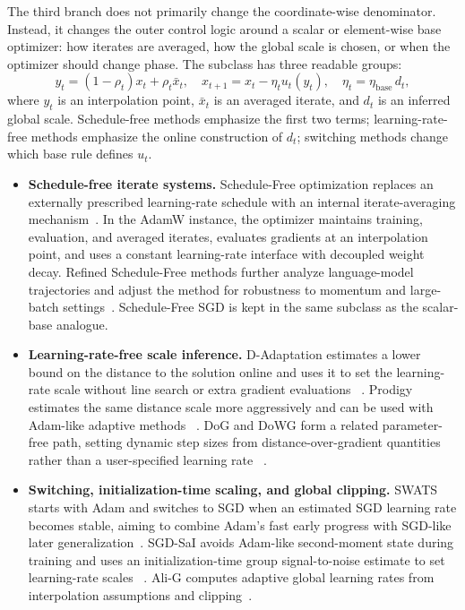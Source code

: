 The third branch does not primarily change the coordinate-wise denominator.
Instead, it changes the outer control logic around a scalar or element-wise
base optimizer: how iterates are averaged, how the global scale is chosen, or
when the optimizer should change phase.  The subclass has three readable
groups:
\begin{equation}
  y_t = (1-\rho_t)x_t+\rho_t \bar{x}_t, \quad
  x_{t+1}=x_t-\eta_t u_t(y_t), \quad
  \eta_t=\eta_{\mathrm{base}}\,d_t,
  \label{eq:t1-outer-control-template}
\end{equation}
where $y_t$ is an interpolation point, $\bar{x}_t$ is an averaged iterate, and
$d_t$ is an inferred global scale.  Schedule-free methods emphasize the first
two terms; learning-rate-free methods emphasize the online construction of
$d_t$; switching methods change which base rule defines $u_t$.
\begin{itemize}
  \setlength{\itemsep}{2pt}
  \item \textbf{Schedule-free iterate systems.}  Schedule-Free optimization
  replaces an externally prescribed learning-rate schedule with an internal
  iterate-averaging mechanism~\citep{defazio2024road}.  In the AdamW instance,
  the optimizer maintains training, evaluation, and averaged iterates, evaluates
  gradients at an interpolation point, and uses a constant learning-rate
  interface with decoupled weight decay.  Refined Schedule-Free methods further
  analyze language-model trajectories and adjust the method for robustness to
  momentum and large-batch settings~\citep{song2026through}.  Schedule-Free SGD
  is kept in the same subclass as the scalar-base analogue.
  \item \textbf{Learning-rate-free scale inference.}  D-Adaptation estimates a
  lower bound on the distance to the solution online and uses it to set the
  learning-rate scale without line search or extra gradient evaluations
  ~\citep{defazio2023dadaptation}.  Prodigy estimates the same distance scale
  more aggressively and can be used with Adam-like adaptive methods
  ~\citep{mishchenko2023prodigy}.  DoG and DoWG form a related
  parameter-free path, setting dynamic step sizes from distance-over-gradient
  quantities rather than a user-specified learning rate
  ~\citep{ivgi2023dog,khaled2023dowg}.
  \item \textbf{Switching, initialization-time scaling, and global clipping.}
  SWATS starts with Adam and switches to SGD when an estimated SGD learning
  rate becomes stable, aiming to combine Adam's fast early progress with
  SGD-like later generalization~\citep{keskar2017swats}.  SGD-SaI avoids
  Adam-like second-moment state during training and uses an initialization-time
  group signal-to-noise estimate to set learning-rate scales
  ~\citep{xu2024no}.  Ali-G computes adaptive global learning rates
  from interpolation assumptions and clipping~\citep{berrada2020training}.
\end{itemize}

